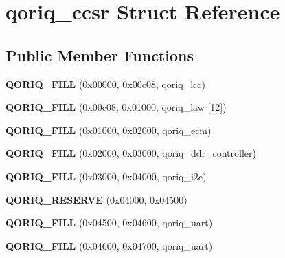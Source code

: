 \hypertarget{structqoriq__ccsr}{}\section{qoriq\+\_\+ccsr Struct Reference}
\label{structqoriq__ccsr}
\subsection*{Public Member Functions}
\begin{DoxyCompactItemize}
\item 
\mbox{\label{structqoriq__ccsr_ac0eb9cb786290458a517f436eec6b992}} 
{\bfseries Q\+O\+R\+I\+Q\+\_\+\+F\+I\+LL} (0x00000, 0x00c08, qoriq\+\_\+lcc)
\item 
\mbox{\label{structqoriq__ccsr_a94b5a9ee6d80811ee205ebd3bc9826c3}} 
{\bfseries Q\+O\+R\+I\+Q\+\_\+\+F\+I\+LL} (0x00c08, 0x01000, qoriq\+\_\+law \mbox{[}12\mbox{]})
\item 
\mbox{\label{structqoriq__ccsr_ad8a5461f4772424d02562d632c6dea94}} 
{\bfseries Q\+O\+R\+I\+Q\+\_\+\+F\+I\+LL} (0x01000, 0x02000, qoriq\+\_\+ecm)
\item 
\mbox{\label{structqoriq__ccsr_adc60570b213a0d2349a81ec8eceae798}} 
{\bfseries Q\+O\+R\+I\+Q\+\_\+\+F\+I\+LL} (0x02000, 0x03000, qoriq\+\_\+ddr\+\_\+controller)
\item 
\mbox{\label{structqoriq__ccsr_a1b029ac8f4a3b6cc2ad1c3cae23db735}} 
{\bfseries Q\+O\+R\+I\+Q\+\_\+\+F\+I\+LL} (0x03000, 0x04000, qoriq\+\_\+i2c)
\item 
\mbox{\label{structqoriq__ccsr_ab3df524419ea3d37e2b05b4500ac534a}} 
{\bfseries Q\+O\+R\+I\+Q\+\_\+\+R\+E\+S\+E\+R\+VE} (0x04000, 0x04500)
\item 
\mbox{\label{structqoriq__ccsr_a4fd28045975f9bcb981ba5aa1e7b5d83}} 
{\bfseries Q\+O\+R\+I\+Q\+\_\+\+F\+I\+LL} (0x04500, 0x04600, qoriq\+\_\+uart)
\item 
\mbox{\label{structqoriq__ccsr_a7426839baf4b46faeb59feabf00ca4f1}} 
{\bfseries Q\+O\+R\+I\+Q\+\_\+\+F\+I\+LL} (0x04600, 0x04700, qoriq\+\_\+uart)

\end{DoxyCompactItemize}
